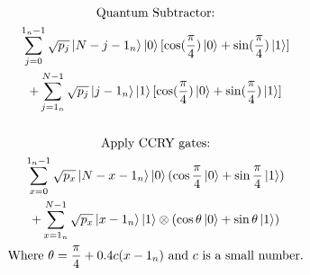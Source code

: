 \documentclass[border=0pt,varwidth]{standalone}
\begin{document}
\vspace*{1em}
\begin{gather*}
\text{Quantum Subtractor:} \\
\sum^{1_n-1}_{j=0}\sqrt{p_j}\ket{N-j-1_n}\ket{0}
[\cos(\frac{\pi}{4})\ket{0}+\sin(\frac{\pi}{4})\ket{1}] \\
+\sum^{N-1}_{j=1_n}\sqrt{p_j}\ket{j-1_n}\ket{1}
[\cos(\frac{\pi}{4})\ket{0}+\sin(\frac{\pi}{4})\ket{1}] \\\\
\text{Apply CCRY gates:} \\
\sum^{1_n-1}_{x=0}\sqrt{p_x}\ket{N-x-1_n}\ket{0}
(\cos\frac{\pi}{4}\ket{0}+\sin\frac{\pi}{4}\ket{1}) \\
+\sum^{N-1}_{x=1_n}\sqrt{p_x}\ket{x-1_n}\ket{1}\otimes
(\cos\theta\ket{0}+\sin\theta\ket{1}) \\
\text{Where }\theta=\frac{\pi}{4}+0.4c(x-1_n)\text{ and }c\text{ is a small number.}
\end{gather*}
\vspace*{1em}
\end{document}
